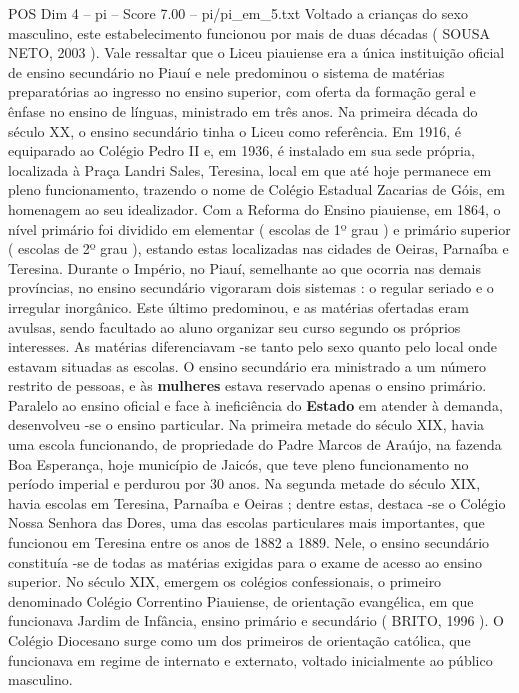 \begin{textsample}{POS Dim 4 – pi – Score 7.00 – pi/pi\_em\_5.txt}
Voltado a crianças do sexo masculino, este estabelecimento funcionou por mais de duas décadas ( SOUSA NETO, 2003 ).
Vale ressaltar que o Liceu piauiense era a única instituição oficial de ensino secundário no Piauí e nele predominou o sistema de matérias preparatórias ao ingresso no ensino superior, com oferta da formação geral e ênfase no ensino de línguas, ministrado em três anos.
Na primeira década do século XX, o ensino secundário tinha o Liceu como referência.
Em 1916, é equiparado ao Colégio Pedro II e, em 1936, é instalado em sua sede própria, localizada à Praça Landri Sales, Teresina, local em que até hoje permanece em pleno funcionamento, trazendo o nome de Colégio Estadual Zacarias de Góis, em homenagem ao seu idealizador.
Com a Reforma do Ensino piauiense, em 1864, o nível primário foi dividido em elementar ( escolas de 1º grau ) e primário superior ( escolas de 2º grau ), estando estas localizadas nas cidades de Oeiras, Parnaíba e Teresina.
Durante o Império, no Piauí, semelhante ao que ocorria nas demais províncias, no ensino secundário vigoraram dois sistemas : o regular seriado e o irregular inorgânico.
Este último predominou, e as matérias ofertadas eram avulsas, sendo facultado ao aluno organizar seu curso segundo os próprios interesses.
As matérias diferenciavam -se tanto pelo sexo quanto pelo local onde estavam situadas as escolas.
O ensino secundário era ministrado a um número restrito de pessoas, e às \textbf{mulheres} estava reservado apenas o ensino primário.
Paralelo ao ensino oficial e face à ineficiência do \textbf{Estado} em atender à demanda, desenvolveu -se o ensino particular.
Na primeira metade do século XIX, havia uma escola funcionando, de propriedade do Padre Marcos de Araújo, na fazenda Boa Esperança, hoje município de Jaicós, que teve pleno funcionamento no período imperial e perdurou por 30 anos.
Na segunda metade do século XIX, havia escolas em Teresina, Parnaíba e Oeiras ; dentre estas, destaca -se o Colégio Nossa Senhora das Dores, uma das escolas particulares mais importantes, que funcionou em Teresina entre os anos de 1882 a 1889.
Nele, o ensino secundário constituía -se de todas as matérias exigidas para o exame de acesso ao ensino superior.
No século XIX, emergem os colégios confessionais, o primeiro denominado Colégio Correntino Piauiense, de orientação evangélica, em que funcionava Jardim de Infância, ensino primário e secundário ( BRITO, 1996 ).
O Colégio Diocesano surge como um dos primeiros de orientação católica, que funcionava em regime de internato e externato, voltado inicialmente ao público masculino.

\end{textsample}
